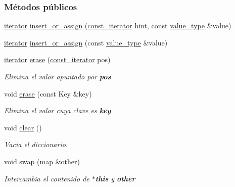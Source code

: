\subsubsection*{Métodos públicos}
\begin{DoxyCompactItemize}
\item 
\hyperlink{classaed2_1_1iterator_1_1iterator}{iterator} \hyperlink{classaed2_1_1iterator_aab34e7001b3ee3ce79da8ea24d7e6351_aab34e7001b3ee3ce79da8ea24d7e6351}{insert\+\_\+or\+\_\+assign} (\hyperlink{classaed2_1_1iterator_1_1const__iterator}{const\+\_\+iterator} hint, const \hyperlink{classaed2_1_1iterator_a6411a2c08b2b7c52f063bef1a168acb6_a6411a2c08b2b7c52f063bef1a168acb6}{value\+\_\+type} \&value)
\item 
\hyperlink{classaed2_1_1iterator_1_1iterator}{iterator} \hyperlink{classaed2_1_1iterator_af131c4b0d89978372a0c8ce38bf8f33e_af131c4b0d89978372a0c8ce38bf8f33e}{insert\+\_\+or\+\_\+assign} (const \hyperlink{classaed2_1_1iterator_a6411a2c08b2b7c52f063bef1a168acb6_a6411a2c08b2b7c52f063bef1a168acb6}{value\+\_\+type} \&value)
\item 
\hyperlink{classaed2_1_1iterator_1_1iterator}{iterator} \hyperlink{classaed2_1_1iterator_adf371aaec9e68bd4a4d5a889d0b6b679_adf371aaec9e68bd4a4d5a889d0b6b679}{erase} (\hyperlink{classaed2_1_1iterator_1_1const__iterator}{const\+\_\+iterator} pos)
\begin{DoxyCompactList}\small\item\em Elimina el valor apuntado por {\bfseries pos} \end{DoxyCompactList}\item 
void \hyperlink{classaed2_1_1iterator_a0a0e62b2a2c0fb98f431164c66a6e388_a0a0e62b2a2c0fb98f431164c66a6e388}{erase} (const Key \&key)
\begin{DoxyCompactList}\small\item\em Elimina el valor cuya clave es {\bfseries key} \end{DoxyCompactList}\item 
void \hyperlink{classaed2_1_1iterator_ac98b533e402839c99d33d3118906c38f_ac98b533e402839c99d33d3118906c38f}{clear} ()
\begin{DoxyCompactList}\small\item\em Vacia el diccionario. \end{DoxyCompactList}\item 
void \hyperlink{classaed2_1_1iterator_a8ec2215b2dfaf6ddd57b1e0b00d8d3d2_a8ec2215b2dfaf6ddd57b1e0b00d8d3d2}{swap} (\hyperlink{classaed2_1_1map}{map} \&other)
\begin{DoxyCompactList}\small\item\em Intercambia el contenido de {\bfseries $\ast$this} y {\bfseries other} \end{DoxyCompactList}\end{DoxyCompactItemize}
